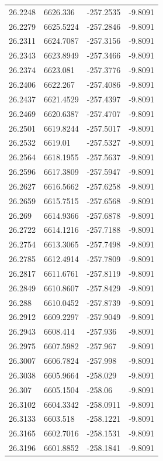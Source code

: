 \begin{table}[H]
\begin{tabular}{llll}
26.2248 & 6626.336 & -257.2535 & -9.8091 \\
26.2279 & 6625.5224 & -257.2846 & -9.8091 \\
26.2311 & 6624.7087 & -257.3156 & -9.8091 \\
26.2343 & 6623.8949 & -257.3466 & -9.8091 \\
26.2374 & 6623.081 & -257.3776 & -9.8091 \\
26.2406 & 6622.267 & -257.4086 & -9.8091 \\
26.2437 & 6621.4529 & -257.4397 & -9.8091 \\
26.2469 & 6620.6387 & -257.4707 & -9.8091 \\
26.2501 & 6619.8244 & -257.5017 & -9.8091 \\
26.2532 & 6619.01 & -257.5327 & -9.8091 \\
26.2564 & 6618.1955 & -257.5637 & -9.8091 \\
26.2596 & 6617.3809 & -257.5947 & -9.8091 \\
26.2627 & 6616.5662 & -257.6258 & -9.8091 \\
26.2659 & 6615.7515 & -257.6568 & -9.8091 \\
26.269 & 6614.9366 & -257.6878 & -9.8091 \\
26.2722 & 6614.1216 & -257.7188 & -9.8091 \\
26.2754 & 6613.3065 & -257.7498 & -9.8091 \\
26.2785 & 6612.4914 & -257.7809 & -9.8091 \\
26.2817 & 6611.6761 & -257.8119 & -9.8091 \\
26.2849 & 6610.8607 & -257.8429 & -9.8091 \\
26.288 & 6610.0452 & -257.8739 & -9.8091 \\
26.2912 & 6609.2297 & -257.9049 & -9.8091 \\
26.2943 & 6608.414 & -257.936 & -9.8091 \\
26.2975 & 6607.5982 & -257.967 & -9.8091 \\
26.3007 & 6606.7824 & -257.998 & -9.8091 \\
26.3038 & 6605.9664 & -258.029 & -9.8091 \\
26.307 & 6605.1504 & -258.06 & -9.8091 \\
26.3102 & 6604.3342 & -258.0911 & -9.8091 \\
26.3133 & 6603.518 & -258.1221 & -9.8091 \\
26.3165 & 6602.7016 & -258.1531 & -9.8091 \\
26.3196 & 6601.8852 & -258.1841 & -9.8091 \\

\end{tabular}
\end{table}
